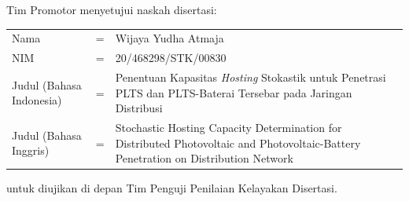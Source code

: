 {}
\vspace*{8pt}

\BgThispage

\noindent Tim Promotor menyetujui naskah disertasi:
\vspace*{-8pt}
{
\begin{longtable}{llp{264pt}}
	\hspace*{-11pt}Nama						& = & Wijaya Yudha Atmaja\\
	\hspace*{-11pt}NIM						& = & 20/468298/STK/00830\\
	\hspace*{-11pt}Judul (Bahasa Indonesia)	& = & Penentuan Kapasitas \textit{Hosting} Stokastik untuk Penetrasi PLTS dan PLTS-Baterai Tersebar pada Jaringan Distribusi\\
	\hspace*{-11pt}Judul	(Bahasa Inggris) 	& = & Stochastic Hosting Capacity Determination for Distributed Photovoltaic and Photovoltaic-Battery Penetration on Distribution Network
\end{longtable}
}
\vspace*{-22pt}
\noindent untuk diujikan di depan Tim Penguji Penilaian Kelayakan Disertasi.
\vspace*{5cm}

